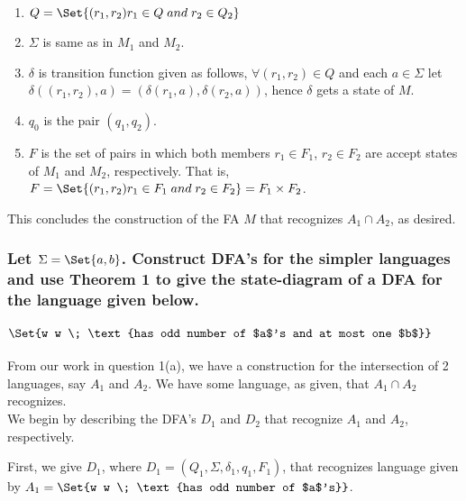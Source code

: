 \documentclass{article}
\providecommand\given{} %
\begin{document}
\begin{enumerate}
    \item $Q = \Set{(r_1, r_2) \given r_1 \in Q \; and \; r_2 \in Q_2}$
    \item $\Sigma$ is same as in $M_1$ and $M_2$.
    \item $\delta$ is transition function given as follows,
    $\forall (r_1, r_2) \in Q$ and each $a \in \Sigma$ let $\delta((r_1, r_2), a) = (\delta(r_1, a), \delta(r_2, a))$, hence $\delta$ gets a state of $M$.
    \item $q_0$ is the pair $(q_1, q_2)$.
    \item $F$ is the set of pairs in which both members $r_1 \in F_1$, $r_2 \in F_2$ are accept states of $M_1$ and $M_2$, respectively.  That is, \\ $F = \Set{(r_1, r_2) \given r_1 \in F_1 \; and \; r_2 \in F_2} = F_1 \times F_2$.
\end{enumerate}

This concludes the construction of the FA $M$ that recognizes $A_1 \cap A_2$, as desired.

\subsubsection{Let $\Sigma = \Set{a,b}$. Construct DFA's for the simpler languages and use Theorem 1 to give the state-diagram of a DFA for the language given below.}

\paragraph{$\Set{w \given w \; \text{has odd number of $a$'s and at most one $b$}}$}

\paragraph{}

From our work in question 1(a), we have a construction for the intersection of 2 languages, say $A_1$ and $A_2$.  We have some language, as given, that $A_1 \cap A_2$ recognizes.  \\

We begin by describing the DFA's $D_1$ and $D_2$ that recognize $A_1$ and $A_2$, respectively.  

First, we give $D_1$, where $D_1 = (Q_1, \Sigma, \delta_1, q_1, F_1)$, that recognizes language given by $A_1 = \Set{w \given w \; \text{has odd number of $a$'s}}$.
\end{document}
